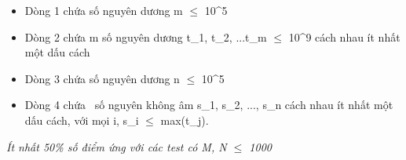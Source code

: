 \begin{itemize}
	\item     Dòng 1 chứa số nguyên dương m  $\le$  10^5   
	\item     Dòng 2 chứa m số nguyên dương t\_1, t\_2, ...t\_m  $\le$  10^9 cách nhau ít nhất một dấu cách   
	\item     Dòng 3 chứa số nguyên dương n  $\le$  10^5   
	\item     Dòng 4 chứa     số nguyên không âm s\_1, s\_2, ..., s\_n cách nhau ít nhất một dấu cách, với mọi i, s\_i  $\le$  max(t\_j).   
\end{itemize}

\emph{    Ít nhất 50\% số điểm ứng với các test có M, N  $\le$  1000   }\emph{}
